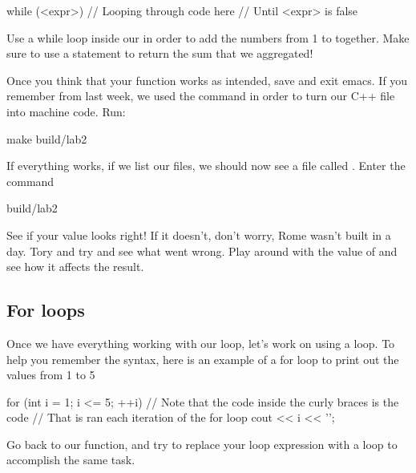 \documentclass{tufte-handout}
\begin{document}
\begin{Code}
    while (<expr>) {
        // Looping through code here
        // Until <expr> is false
    }
\end{Code}


Use a while loop inside our  in order to add the numbers from 1 to  together.
Make sure to use a  statement to return the sum that we aggregated!

Once you think that your function works as intended, save and exit emacs. If you remember from last week, we used the  command in order to turn our C++ file into machine code. Run:
\begin{CmdLine}
  \prompt make build/lab2
\end{CmdLine}
If everything works, if we list our files, we should now see a file called .  Enter the command
\begin{CmdLine}
  \prompt build/lab2
\end{CmdLine}
See if your value looks right!  If it doesn't, don't worry, Rome wasn't built in a day.  Tory and try and see what went wrong.  Play around with the value of  and see how it affects the result.

\subsection{For loops}


Once we have everything working with our  loop, let's work on using a  loop.  To help you remember the syntax, here is an example of a for loop to print out the values from 1 to 5

\begin{Code}
    for (int i = 1; i <= 5; ++i) {
        // Note that the code inside the curly braces is the code
        // That is ran each iteration of the for loop
        cout << i << '\n';
    }
\end{Code}

Go back to our  function, and try to replace your  loop expression with a  loop to accomplish the same task.
\end{document}
